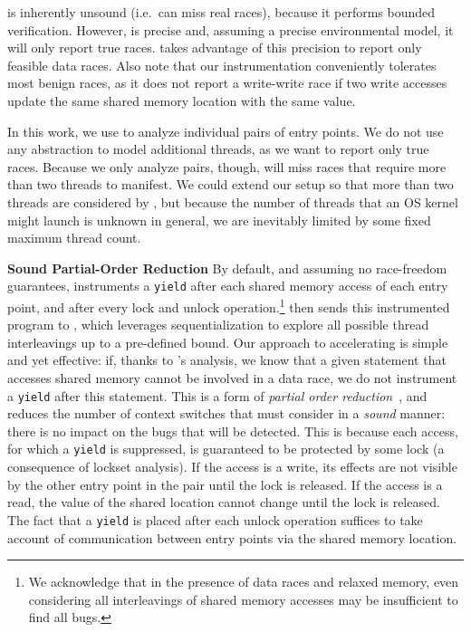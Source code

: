 \corral is inherently unsound (i.e.\ can miss real races), because it performs bounded verification. However, \corral is precise and, assuming a precise environmental model, it will only report true races. \whoop takes advantage of this precision to report only feasible data races. Also note that our instrumentation conveniently tolerates most benign races, as it does not report a write-write race if two write accesses update the same shared memory location with the same value.

In this work, we use \corral to analyze individual pairs of entry points. We do not use any abstraction to model additional threads, as we want \corral to report only true races. Because we only analyze pairs, though, \corral will miss races that require more than two threads to manifest. We could extend our setup so that more than two threads are considered by \corral, but because the number of threads that an OS kernel might launch is unknown in general, we are inevitably limited by some fixed maximum thread count.

\noindent\textbf{Sound Partial-Order Reduction }
%
By default, and assuming no race-freedom guarantees, \whoop instruments a \texttt{yield} after each shared memory access of each entry point, and after every lock and unlock operation.\footnote{We acknowledge that in the presence of data races and relaxed memory, even considering all interleavings of shared memory accesses may be insufficient to find all bugs.} \whoop then sends this instrumented program to \corral, which leverages sequentialization to explore all possible thread interleavings up to a pre-defined bound. Our approach to accelerating \corral is simple and yet effective: if, thanks to \whoop's analysis, we know that a given statement that accesses shared memory cannot be involved in a data race, we do not instrument a \texttt{yield} after this statement.  This is a form of \emph{partial order reduction}~\cite{DBLP:books/sp/Godefroid96}, and reduces the number of context switches that \corral must consider in a \emph{sound} manner: there is no impact on the bugs that will be detected.  This is because each access, for which a \texttt{yield} is suppressed, is guaranteed to be protected by some lock (a consequence of lockset analysis).  If the access is a write, its effects are not visible by the other entry point in the pair until the lock is released.  If the access is a read, the value of the shared location cannot change until the lock is released.  The fact that a \texttt{yield} is placed after each unlock operation suffices to take account of communication between entry points via the shared memory location.

